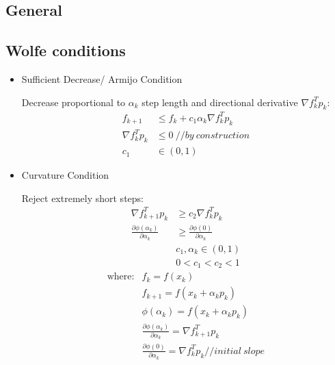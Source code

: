 \documentclass[8pt,letter]{article}
\begin{document}

\begin{multicols*}{2}

  \section{General}

  \subsection{Wolfe conditions}

  \begin{itemize}
    
  \item Sufficient Decrease/ Armijo Condition
    
  Decrease proportional to $\alpha_k$ step length and directional derivative $\nabla f_k^T p_k$:
  \begin{align}
    f_{k+1} & \leq f_k + c_1 \alpha_k \nabla f_k^T p_k\\
    \nabla f_k^T p_k & \leq 0\ //by\ construction\\
    c_1 & \in (0,1)
  \end{align}
  
  \item Curvature Condition
  
  Reject extremely short steps:
  \begin{align}
    \nabla f_{k+1}^T p_k & \geq c_2 \nabla f_k^T p_k\\
    \frac{\partial \phi(\alpha_k)}{\partial \alpha_k} & \geq \frac{\partial \phi(0)}{\partial \alpha_k}\\
              &c_1,\alpha_k \in (0,1)\\
    &0<c_1<c_2<1
  \end{align}
  \begin{align*}
  \text{where}:& f_{k} = f(x_k)\\
  & f_{k+1} = f(x_k+\alpha_k p_k)\\
  & \phi(\alpha_k) = f(x_k + \alpha_k p_k)\\
  & \frac{\partial \phi(\alpha_k)}{\partial \alpha_k} = \nabla f_{k+1}^T p_k\\
  & \frac{\partial \phi(0)}{\partial \alpha_k} = \nabla f_{k}^T p_k //initial\ slope
  \end{align*}

  \end{itemize}
  

\end{multicols*}
\end{document}
